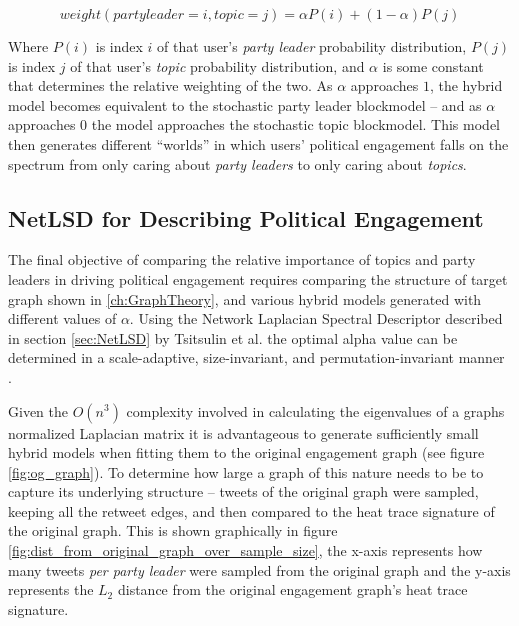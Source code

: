 \begin{equation}
    weight(party leader=i, topic=j)=\alpha P(i)+(1-\alpha)P(j)
\end{equation}

Where $P(i)$ is index $i$ of that user's \emph{party leader} probability
distribution, $P(j)$ is index $j$ of that user's \emph{topic} probability
distribution, and $\alpha$ is some constant that determines the relative
weighting of the two. As $\alpha$ approaches $1$, the hybrid model becomes
equivalent to the stochastic party leader blockmodel -- and as $\alpha$
approaches $0$ the model approaches the stochastic topic blockmodel. This model
then generates different ``worlds'' in which users' political engagement falls
on the spectrum from only caring about \emph{party leaders} to only caring about
\emph{topics}.

\subsection{NetLSD for Describing Political Engagement}\label{sec:NetLSDForSBM}

The final objective of comparing the relative importance of topics and party
leaders in driving political engagement requires comparing the structure of
target graph shown in \ref{ch:GraphTheory}, and various hybrid models generated
with different values of $\alpha$. Using the Network Laplacian Spectral
Descriptor described in section \ref{sec:NetLSD} by Tsitsulin et al. the optimal
alpha value can be determined in a scale-adaptive, size-invariant, and
permutation-invariant manner \cite{netlsd}.

Given the $O(n^{3})$ complexity involved in calculating the eigenvalues of a
graphs normalized Laplacian matrix it is advantageous to generate sufficiently
small hybrid models when fitting them to the original engagement graph (see
figure \ref{fig:og_graph}). To determine how large a graph of this nature needs
to be to capture its underlying structure -- tweets of the original graph were
sampled, keeping all the retweet edges, and then compared to the heat trace
signature of the original graph. This is shown graphically in figure
\ref{fig:dist_from_original_graph_over_sample_size}, the x-axis represents how
many tweets \emph{per party leader} were sampled from the original graph and the
y-axis represents the $L_{2}$ distance from the original engagement graph's heat
trace signature. 

